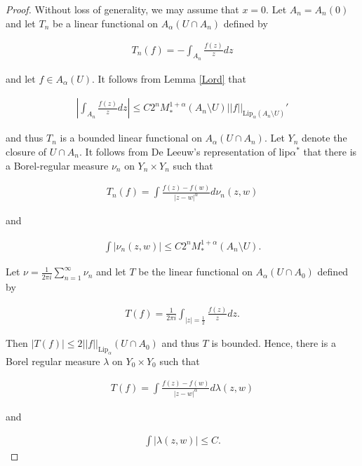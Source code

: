 \documentclass{article}
\theoremstyle{definition}
\begin{document}
\begin{proof}
    Without loss of generality, we may assume that $x=0$. Let $A_n = A_n(0)$ and let $T_n$ be a linear functional on $A_\alpha(U \cap A_n)$ defined by

\begin{align*}
    T_n(f) = -\int_{A_n} \frac{f(z)}{z} dz
\end{align*}

\noindent and let $f \in A_\alpha(U)$. It follows from Lemma \ref{Lord} that 

\begin{align*}
    \left| \int_{A_n} \frac{f(z)}{z} dz \right| \leq C 2^n M_*^{1+\alpha}(A_n \setminus U) ||f||_{\text{Lip}_{\alpha}(A_n \setminus U)}'
\end{align*}


\noindent and thus $T_n$ is a bounded linear functional on $A_{\alpha}(U \cap A_n)$. Let $Y_n$ denote the closure of $U \cap A_n$. It follows from De Leeuw's representation of lip$\alpha^*$ that there is a Borel-regular measure $\nu_n$ on $Y_n \times Y_n$ such that

\begin{align*}
    T_n(f) = \int \frac{f(z)-f(w)}{|z-w|^{\alpha}} d\nu_n(z,w)
\end{align*}


\noindent and 

\begin{align*}
    \int |\nu_n(z,w)| \leq C 2^n M_*^{1+\alpha}(A_n \setminus U).
\end{align*}

\noindent Let $\displaystyle \nu = \frac{1}{2\pi i} \sum_{n=1}^{\infty} \nu_n$ and let $T$ be the linear functional on $A_\alpha(U \cap A_0)$ defined by 

\begin{align*}
    T(f) = \frac{1}{2\pi i}\int_{|z|=\frac{1}{2}} \frac{f(z)}{z} dz.
\end{align*}

\noindent Then $|T(f)| \leq 2||f||_{\text{Lip}_{\alpha}}(U \cap A_0)$ and thus $T$ is bounded. Hence, there is a Borel regular measure $\lambda$ on $Y_0 \times Y_0$ such that 

\begin{align*}
    T(f) = \int \frac{f(z)-f(w)}{|z-w|^{\alpha}} d\lambda(z,w)
\end{align*}

\noindent and 

\begin{align*}
    \int |\lambda(z,w)| \leq C.
\end{align*}



\end{proof}
\end{document}

